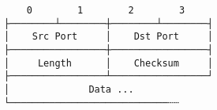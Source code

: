 \documentclass[varwidth,crop]{standalone}
\begin{document}
\begin{verbatim}
    0        1        2        3
├────────┴────────┼────────┴────────┤
│    Src Port     │    Dst Port     │
├─────────────────┼─────────────────┤
│     Length      │    Checksum     │
├─────────────────┴─────────────────┘
│              Data ...
└────────────────────────────┄┄
\end{verbatim}
\end{document}
